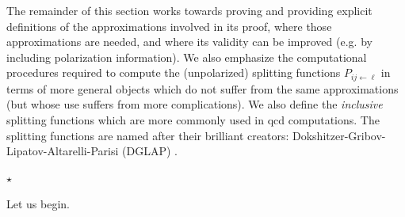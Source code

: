 The remainder of this section works towards proving  and providing explicit definitions of the approximations involved in its proof, where those approximations are needed, and where its validity can be improved (e.g. by including polarization information).
%
We also emphasize the computational procedures required to compute the (unpolarized) splitting functions \(P_{ij \leftarrow \ell}\) in terms of more general objects which do not suffer from the same approximations (but whose use suffers from more complications).
%
We also define the \textit{inclusive} splitting functions which are more commonly used in \gls{qcd} computations.
%
The splitting functions are named after their brilliant creators:
%
Dokshitzer-Gribov-Lipatov-Altarelli-Parisi (DGLAP) \cite{Gribov:1972ri,Dokshitzer:1977sg,Altarelli:1977zs}.

\vspace{15pt}
{\leavevmode\xleaders\hbox{$\star$}\hfill\kern0.5pt}
\vspace{5pt}
\begin{center}
Let us begin.
\end{center}
\vspace{15pt}

